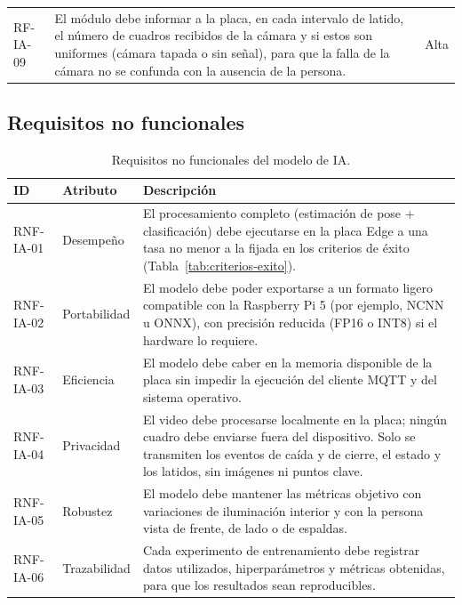 \documentclass[12pt,a4paper,oneside]{book}
\theoremstyle{plain}
\theoremstyle{definition}
\theoremstyle{remark}
\begin{document}
{\begin{longtable}{L{1.9cm}L{6.6cm}L{1.8cm}}
\addlinespace
RF-IA-09 & El módulo debe informar a la placa, en cada intervalo de latido, el número de cuadros recibidos de la cámara y si estos son uniformes (cámara tapada o sin señal), para que la falla de la cámara no se confunda con la ausencia de la persona. & Alta \\
\end{longtable}
}

\subsection{Requisitos no funcionales}

\begin{table}[H]
\centering
\caption{Requisitos no funcionales del modelo de IA.}
\label{tab:rnf-ia}
\small
\begin{tabular}{L{2.1cm}L{2.2cm}L{6.1cm}}
\toprule
\textbf{ID} & \textbf{Atributo} & \textbf{Descripción} \\
\midrule
RNF-IA-01 & Desempeño & El procesamiento completo (estimación de pose + clasificación) debe ejecutarse en la placa Edge a una tasa no menor a la fijada en los criterios de éxito (Tabla~\ref{tab:criterios-exito}). \\
\addlinespace
RNF-IA-02 & Portabilidad & El modelo debe poder exportarse a un formato ligero compatible con la Raspberry Pi 5 (por ejemplo, NCNN \parencite{tencent2026ncnn} u ONNX), con precisión reducida (FP16 o INT8) si el hardware lo requiere. \\
\addlinespace
RNF-IA-03 & Eficiencia & El modelo debe caber en la memoria disponible de la placa sin impedir la ejecución del cliente MQTT y del sistema operativo. \\
\addlinespace
RNF-IA-04 & Privacidad & El video debe procesarse localmente en la placa; ningún cuadro debe enviarse fuera del dispositivo. Solo se transmiten los eventos de caída y de cierre, el estado y los latidos, sin imágenes ni puntos clave. \\
\addlinespace
RNF-IA-05 & Robustez & El modelo debe mantener las métricas objetivo con variaciones de iluminación interior y con la persona vista de frente, de lado o de espaldas. \\
\addlinespace
RNF-IA-06 & Trazabilidad & Cada experimento de entrenamiento debe registrar datos utilizados, hiperparámetros y métricas obtenidas, para que los resultados sean reproducibles. \\
\bottomrule
\end{tabular}
\end{table}
\end{document}
